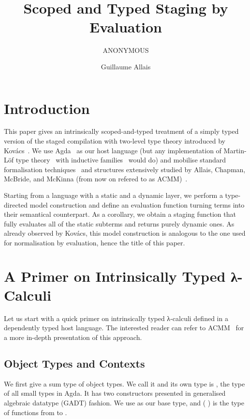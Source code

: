 \documentclass{article}
\title{Scoped and Typed Staging by Evaluation}
\author{ANONYMOUS}
\author{Guillaume Allais}
\begin{document}
\maketitle

\section{Introduction}

This paper gives an intrinsically scoped-and-typed
treatment of a simply typed version of the staged compilation
with two-level type theory introduced by
Kov{\'{a}}cs~\cite{DBLP:journals/pacmpl/Kovacs22}.
%
We use Agda~\cite{DBLP:conf/afp/Norell08}
as our host language (but any implementation
of Martin-Löf type theory~\cite{DBLP:books/daglib/0000395}
with inductive families~\cite{DBLP:journals/fac/Dybjer94}
would do)
and mobilise standard formalisation
techniques~\cite{DBLP:journals/lisp/Coquand02, DBLP:journals/jar/BentonHKM12}
and structures extensively studied by Allais, Chapman,
McBride, and McKinna (from now on refered to as ACMM)~\cite{DBLP:conf/cpp/Allais0MM17}.

Starting from a language with a static and a dynamic layer,
we perform a type-directed model construction
and define an evaluation function turning terms
into their semantical counterpart.
%
As a corollary, we obtain a staging function that
fully evaluates all of the static subterms and returns
purely dynamic ones.
%
As already observed by Kov{\'{a}}cs, this model construction
is analogous to the one used for normalisation by evaluation,
hence the title of this paper.


\section{A Primer on Intrinsically Typed λ-Calculi}\label{sec:intrinsictyping}

Let us start with a quick primer on intrinsically typed λ-calculi
defined in a dependently typed host language. The interested reader
can refer to ACMM~\cite{DBLP:conf/cpp/Allais0MM17} for a more in-depth
presentation of this approach.

\subsection{Object Types and Contexts}

We first give a sum type of object types. We call it  and
its own type is , the type of all small types in Agda.
It has two constructors presented in generalised algebraic datatype
(GADT) fashion.
We use  as our base type,
and (  ) is the type of functions from
 to .
\end{document}
